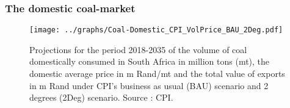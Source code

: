 \documentclass[12pt,english]{article}
\newcommand{\mli}[1]{\mathit{#1}}
\begin{document}


\subsubsection{The domestic coal-market}

\begin{figure}[!t]
	\centering
	\texttt{[image: ../graphs/Coal-Domestic\_CPI\_VolPrice\_BAU\_2Deg.pdf]}
	\caption{\label{Coal-Domestic_CPI_VolPrice_BAU_2Deg}\small Projections for the period 2018-2035 of the volume of coal domestically consumed in South Africa in million tons (mt), the domestic average price in m Rand/mt and the total value of exports in m Rand under CPI's business as usual (BAU) scenario and 2 degrees (2Deg) scenario. Source : CPI.}
\end{figure}
\end{document}
